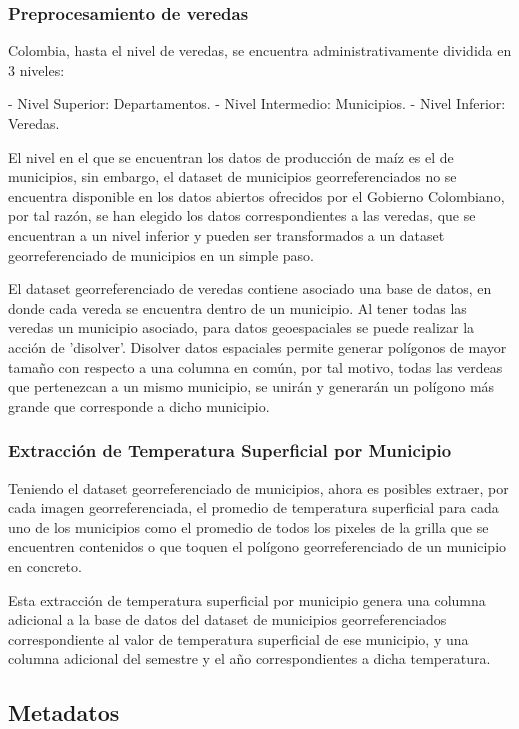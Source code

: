 \documentclass[12pt, spanish]{article}
\begin{document}
\subsubsection{Preprocesamiento de veredas}

Colombia, hasta el nivel de veredas, se encuentra administrativamente dividida en 3 niveles:

- Nivel Superior: Departamentos.
- Nivel Intermedio: Municipios.
- Nivel Inferior: Veredas.

El nivel en el que se encuentran los datos de producción de maíz es el de municipios, sin embargo, el dataset de municipios georreferenciados no se encuentra disponible en los datos abiertos ofrecidos por el Gobierno Colombiano, por tal razón, se han elegido los datos correspondientes a las veredas, que se encuentran a un nivel inferior y pueden ser transformados a un dataset georreferenciado de municipios en un simple paso.

El dataset georreferenciado de veredas contiene asociado una base de datos, en donde cada vereda se encuentra dentro de un municipio. Al tener todas las veredas un municipio asociado, para datos geoespaciales se puede realizar la acción de 'disolver'. Disolver datos espaciales permite generar polígonos de mayor tamaño con respecto a una columna en común, por tal motivo, todas las verdeas que pertenezcan a un mismo municipio, se unirán y generarán un polígono más grande que corresponde a dicho municipio.

\subsubsection{Extracción de Temperatura Superficial por Municipio}

Teniendo el dataset georreferenciado de municipios, ahora es posibles extraer, por cada imagen georreferenciada, el promedio de temperatura superficial para cada uno de los municipios como el promedio de todos los pixeles de la grilla que se encuentren contenidos o que toquen el polígono georreferenciado de un municipio en concreto.

Esta extracción de temperatura superficial por municipio genera una columna adicional a la base de datos del dataset de municipios georreferenciados correspondiente al valor de temperatura superficial de ese municipio, y una columna adicional del semestre y el año correspondientes a dicha temperatura.

\subsection{Metadatos}
\end{document}
